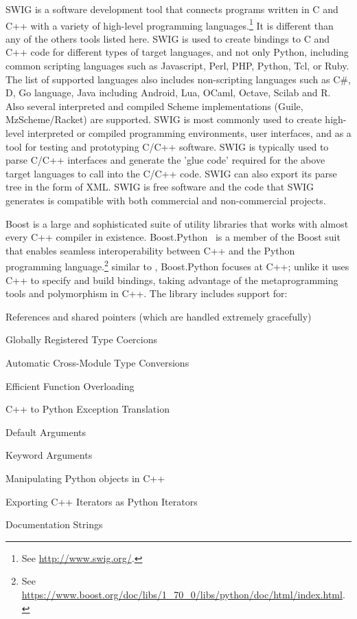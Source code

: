 
SWIG is a software development tool that connects programs written in
C and C++ with a variety of high-level programming
languages.\footnote{See \url{http://www.swig.org/}.}  It is different
than any of the others tools listed here.  SWIG is used to create
bindings to C and C++ code for different types of target languages,
and not only Python, including common scripting languages such as
Javascript, Perl, PHP, Python, Tcl, or Ruby. The list of supported
languages also includes non-scripting languages such as C\#, D, Go
language, Java including Android, Lua, OCaml, Octave, Scilab and
R. Also several interpreted and compiled Scheme implementations
(Guile, MzScheme/Racket) are supported. SWIG is most commonly used to
create high-level interpreted or compiled programming environments,
user interfaces, and as a tool for testing and prototyping C/C++
software. SWIG is typically used to parse C/C++ interfaces and
generate the 'glue code' required for the above target languages to
call into the C/C++ code. SWIG can also export its parse tree in the
form of XML. SWIG is free software and the code that SWIG generates is
compatible with both commercial and non-commercial projects.

Boost is a large and sophisticated suite of utility libraries that works
with almost every C++ compiler in existence.
Boost.Python~\cite{bhsbp-ag-03} is a member of the Boost suit that
enables seamless interoperability between C++ and the Python
programming language.\footnote{See
  \url{https://www.boost.org/doc/libs/1_70_0/libs/python/doc/html/index.html}.}
similar to , Boost.Python focuses at C++; unlike
 it uses C++ to specify and build bindings, taking
advantage of the metaprogramming tools and polymorphism in C++.
The library includes support for:
\begin{compactitem}
\item References and shared pointers (which are handled extremely gracefully)
\item Globally Registered Type Coercions
\item Automatic Cross-Module Type Conversions
\item Efficient Function Overloading
\item C++ to Python Exception Translation
\item Default Arguments
\item Keyword Arguments
\item Manipulating Python objects in C++
\item Exporting C++ Iterators as Python Iterators
\item Documentation Strings
\end{compactitem}

